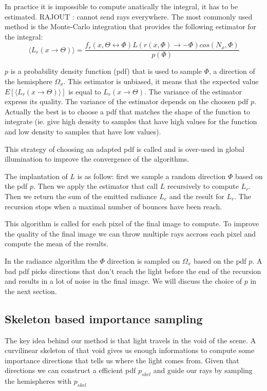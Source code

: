In practice it is impossible to compute anatically the integral, it has to be estimated. RAJOUT : cannot send rays everywhere.
The most commonly used method is the Monte-Carlo integration that provides the following estimator for the integral:
\begin{equation*}
\langle L_r(x \rightarrow \Theta) \rangle = \frac{f_r(x, \Theta \leftrightarrow \Phi) L(r(x, \Phi) \rightarrow -\Phi) cos(N_x, \Phi)}{p(\Phi)}
\end{equation*}

$p$ is a probability density function (pdf) that is used to sample $\Phi$, a direction of the hemisphere $\Omega_x$. This estimator is unbiased, it means that the expected value $E[\langle L_r(x \rightarrow \Theta) \rangle]$ is equal to $L_r(x \rightarrow \Theta)$. The variance of the estimator express its quality.
The variance of the estimator depends on the choosen pdf $p$. Actually the best is to choose a pdf that matches the shape of the function to integrate (ie. give high density to samples that have high values for the function and low density to samples that have low values).

This strategy of choosing an adapted pdf is called  and is over-used in global illumination to improve the convergence of the algorithms.

The implantation of $L$ is as follow: first we sample a random direction $\Phi$ based on the pdf $p$. Then we apply the estimator that call $L$ recursively to compute $L_r$. Then we return the sum of the emitted radiance $L_e$ and the result for $L_r$. The recursion stops when a maximal number of bounces have been reach.

This algorithm is called for each pixel of the final image to compute. To improve the quality of the final image we can throw multiple rays accross each pixel and compute the mean of the results.

In the radiance algorithm the $\Phi$ direction is sampled on $\Omega_x$ based on the pdf $p$. A bad pdf picks directions that don't reach the light before the end of the recursion and results in a lot of noise in the final image. We will discuss the choice of $p$ in the next section.

\subsection{Skeleton based importance sampling}

The key idea behind our method is that light travels in the void of the scene. A curvilinear skeleton of that void gives us enough informations to compute some importance directions that tells us where the light comes from. Given that directions we can construct a efficient pdf $p_{skel}$ and guide our rays by sampling the hemispheres with $p_{skel}$

